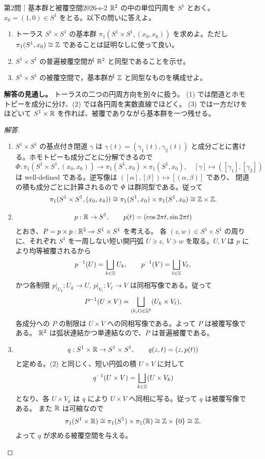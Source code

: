 \begin{problem}{第2問｜基本群と被覆空間}{2026-s-2}
$\mathbb{R}^2$ の中の単位円周を $S^1$ とおく。$x_0=(1,0)\in S^1$ をとる。以下の問いに答えよ。
\begin{enumerate}
  \item[(1)] トーラス $S^1\times S^1$ の基本群 $\pi_1(S^1\times S^1,(x_0,x_0))$ を求めよ。ただし $\pi_1(S^1,x_0)\cong\mathbb{Z}$ であることは証明なしに使って良い。
  \item[(2)] $S^1\times S^1$ の普遍被覆空間が $\mathbb{R}^2$ と同型であることを示せ。
  \item[(3)] $S^1\times S^1$ の被覆空間で，基本群が $\mathbb{Z}$ と同型なものを構成せよ。
\end{enumerate}
\end{problem}
\begin{memo*}
\textbf{解答の見通し。}
トーラスの二つの円周方向を別々に扱う。
(1) では閉道とホモトピーを成分に分け、(2) では各円周を実数直線でほどく。
(3) では一方だけをほどいて $S^1\times\mathbb{R}$ を作れば、被覆でありながら基本群を一つ残せる。
\end{memo*}
\begin{proof}[解答]
\begin{enumerate}
  \item[(1)] $S^1\times S^1$ の基点付き閉道 $\gamma$ は
  $\gamma(t)=(\gamma_1(t),\gamma_2(t))$ と成分ごとに書ける。ホモトピーも成分ごとに分解できるので
  \[
  \Phi:\pi_1(S^1\times S^1,(x_0,x_0))
  \longrightarrow\pi_1(S^1,x_0)\times\pi_1(S^1,x_0),
  \quad
  [\gamma]\longmapsto([\gamma_1],[\gamma_2])
  \]
  は well-defined である。逆写像は $([\alpha],[\beta])\mapsto[(\alpha,\beta)]$ であり、
  閉道の積も成分ごとに計算されるので $\Phi$ は群同型である。従って
  \[
  \pi_1(S^1\times S^1,(x_0,x_0))
  \cong\pi_1(S^1,x_0)\times\pi_1(S^1,x_0)
  \cong\mathbb{Z}\times\mathbb{Z}.
  \]

  \item[(2)]
  \[
  p:\mathbb{R}\to S^1,
  \qquad p(t)=(\cos2\pi t,\sin2\pi t)
  \]
  とおき、$P=p\times p:\mathbb{R}^2\to S^1\times S^1$ を考える。
  各 $(z,w)\in S^1\times S^1$ の周りに、それぞれ $S^1$ を一周しない短い開円弧
  $U\ni z$, $V\ni w$ を取る。$U,V$ は $p$ により均等被覆されるから
  \[
  p^{-1}(U)=\bigsqcup_{k\in\mathbb{Z}}U_k,
  \qquad
  p^{-1}(V)=\bigsqcup_{\ell\in\mathbb{Z}}V_\ell,
  \]
  かつ各制限 $p|_{U_k}:U_k\to U$, $p|_{V_\ell}:V_\ell\to V$ は同相写像である。従って
  \[
  P^{-1}(U\times V)
  =\bigsqcup_{(k,\ell)\in\mathbb{Z}^2}(U_k\times V_\ell),
  \]
  各成分への $P$ の制限は $U\times V$ への同相写像である。よって $P$ は被覆写像である。
  $\mathbb{R}^2$ は弧状連結かつ単連結なので、$P$ は普遍被覆である。

  \item[(3)]
  \[
  q:S^1\times\mathbb{R}\to S^1\times S^1,
  \qquad q(z,t)=(z,p(t))
  \]
  と定める。(2) と同じく、短い円弧の積 $U\times V$ に対して
  \[
  q^{-1}(U\times V)
  =\bigsqcup_{k\in\mathbb{Z}}(U\times V_k)
  \]
  となり、各 $U\times V_k$ は $q$ により $U\times V$ へ同相に写る。従って $q$ は被覆写像である。
  また $\mathbb{R}$ は可縮なので
  \[
  \pi_1(S^1\times\mathbb{R})
  \cong\pi_1(S^1)\times\pi_1(\mathbb{R})
  \cong\mathbb{Z}\times\{0\}\cong\mathbb{Z}.
  \]
  よって $q$ が求める被覆空間を与える。
\end{enumerate}
\end{proof}

